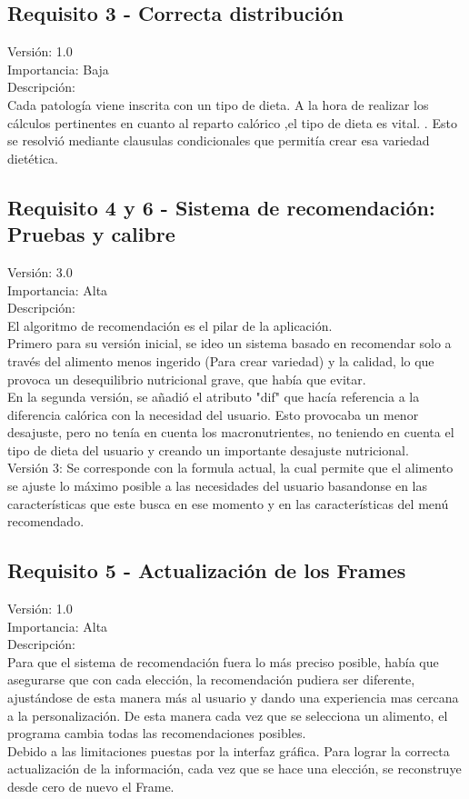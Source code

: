 \subsection{Requisito 3 - Correcta distribución}
Versión: 1.0\\
Importancia: Baja\\
Descripción:\\
Cada patología viene inscrita con un tipo de dieta. A la hora de realizar los cálculos pertinentes en cuanto al reparto calórico ,el tipo de dieta es vital. . Esto se resolvió mediante clausulas condicionales que permitía crear esa variedad dietética.
\subsection{Requisito 4 y 6 - Sistema de recomendación: Pruebas y calibre}
Versión: 3.0\\
Importancia: Alta\\
Descripción:\\
El algoritmo de recomendación es el pilar de la aplicación. \\
Primero para su versión inicial, se ideo un sistema basado en recomendar solo a través del alimento menos ingerido (Para crear variedad) y la calidad, lo que provoca un desequilibrio nutricional grave, que había que evitar.\\
En la segunda versión, se añadió el atributo "dif" que hacía referencia a la diferencia calórica con la necesidad del usuario. Esto provocaba un menor desajuste, pero no tenía en cuenta los macronutrientes, no teniendo en cuenta el tipo de dieta del usuario y creando un importante desajuste nutricional.\\
Versión 3: Se corresponde con la formula actual, la cual permite que el alimento se ajuste lo máximo posible a las necesidades del usuario basandonse en las características que este busca en ese momento y en las características del menú recomendado.
\subsection{Requisito 5 - Actualización de los Frames}
Versión: 1.0\\
Importancia: Alta\\
Descripción:\\
Para que el sistema de recomendación fuera lo más preciso posible, había que asegurarse que con cada elección, la recomendación pudiera ser diferente, ajustándose de esta manera más al usuario y dando una experiencia mas cercana a la personalización. De esta manera cada vez que se selecciona un alimento, el programa cambia todas las recomendaciones posibles.\\
Debido a las limitaciones puestas por la interfaz gráfica. Para lograr la correcta actualización de la información, cada vez que se hace una elección, se reconstruye desde cero de nuevo el Frame.
